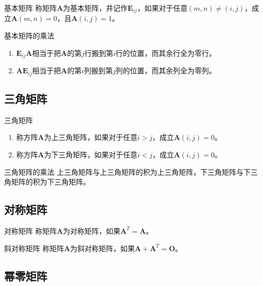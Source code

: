 \documentclass[lang = cn, scheme = chinese, thmcnt = section]{elegantbook}
\newcommand{\bs}{\boldsymbol}          %
\begin{document}
\begin{definition}{基本矩阵}
	称矩阵$\bs{A}$为基本矩阵，并记作$\bs{E}_{ij}$，如果对于任意$(m,n)\ne(i,j)$，成立$\bs{A}(m,n)=0$，且$\bs{A}(i,j)=1$​。
\end{definition}

\begin{proposition}{基本矩阵的乘法}
	\begin{enumerate}
		\item $\bs{E}_{ij}\bs{A}$相当于把$\bs{A}$的第$j$行搬到第$i$行的位置，而其余行全为零行。
		\item $\bs{A}\bs{E}_{ij}$相当于把$\bs{A}$的第$i$列搬到第$j$列的位置，而其余列全为零列。
	\end{enumerate}
\end{proposition}

\subsection{三角矩阵}

\begin{definition}{三角矩阵}
	\begin{enumerate}
		\item 称方阵$\bs{A}$为上三角矩阵，如果对于任意$i>j$，成立$\bs{A}(i,j)=0$。
		\item 称方阵$\bs{A}$为下三角矩阵，如果对于任意$i<j$，成立$\bs{A}(i,j)=0$​。
	\end{enumerate}
\end{definition}

\begin{proposition}{三角矩阵的乘法}
	上三角矩阵与上三角矩阵的积为上三角矩阵，下三角矩阵与下三角矩阵的积为下三角矩阵。
\end{proposition}

\subsection{对称矩阵}

\begin{definition}{对称矩阵}
	称矩阵$\bs{A}$为对称矩阵，如果$\bs{A}^T=\bs{A}$。
\end{definition}

\begin{definition}{斜对称矩阵}
	称矩阵$\bs{A}$为斜对称矩阵，如果$\bs{A}+\bs{A}^T=\bs{O}$。
\end{definition}

\subsection{幂零矩阵}
\end{document}
